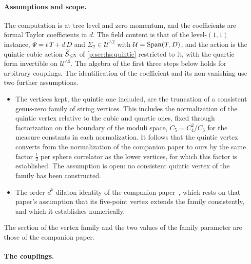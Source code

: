 \paragraph{Assumptions and scope.}

The computation is at tree level and zero momentum, and the coefficients are formal Taylor coefficients in $d$.
The field content is that of the level-$(1, 1)$ instance, $\Psi = t \, T + d \, D$ and $\Sigma_2 \in \mathcal U^{\wedge 2}$ with $\mathcal U = \Span(T, D)$, and the action is the quintic cubic action $\caction[\le 5]$ of \cref{p:sec:hs:quintic} restricted to it, with the quartic form invertible on $\mathcal U^{\wedge 2}$.
The algebra of the first three steps below holds for arbitrary couplings.
The identification of the coefficient and its non-vanishing use two further assumptions.
\begin{itemize}
  \setlength{\itemsep}{0.5ex}

  \item The vertices kept, the quintic one included, are the truncation of a consistent genus-zero family of string vertices.
    This includes the normalization of the quintic vertex relative to the cubic and quartic ones, fixed through factorization on the boundary of the moduli space, $C_5 = C_4^2 / C_3$ for the measure constants in each normalization.
    It follows that the quintic vertex converts from the normalization of the companion paper to ours by the same factor $\tfrac{1}{2}$ per sphere correlator as the lower vertices, for which this factor is established.
    The assumption is open: no consistent quintic vertex of the family has been constructed.

  \item The order-$d^5$ dilaton identity of the companion paper~\cite{Erbin:2026:SL2CVerticesClosed}, which rests on that paper's assumption that its five-point vertex extends the family consistently, and which it establishes numerically.
\end{itemize}
The section of the vertex family and the two values of the family parameter are those of the companion paper.

\paragraph{The couplings.}

